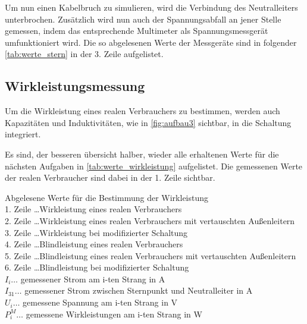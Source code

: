 \documentclass[12pt,english,ngerman]{scrartcl}
\begin{document}
Um nun einen Kabelbruch zu simulieren, wird die Verbindung des Neutralleiters
unterbrochen. Zusätzlich wird nun auch der Spannungsabfall an jener Stelle
gemessen, indem das entsprechende Multimeter als Spannungsmessgerät
umfunktioniert wird. Die so abgelesenen Werte der Messgeräte sind in folgender
\autoref{tab:werte_stern} in der 3. Zeile aufgelistet.

\subsection{Wirkleistungsmessung}
Um die Wirkleistung eines realen Verbrauchers zu bestimmen, werden auch
Kapazitäten und Induktivitäten, wie in \autoref{fig:aufbau3} sichtbar, in die
Schaltung integriert.

Es sind, der besseren übersicht halber, wieder alle erhaltenen Werte für die
nächsten Aufgaben in \autoref{tab:werte_wirkleistung} aufgelistet. Die
gemessenen Werte der realen Verbraucher sind dabei in der 1. Zeile sichtbar.

\begin{table}[H]
	\caption[Abgelesene Werte für die Bestimmung der Wirkleistung] {Abgelesene Werte für die
		Bestimmung der Wirkleistung                                                \\
		1. Zeile \dots Wirkleistung eines realen Verbrauchers                      \\
		2. Zeile \dots Wirkleistung eines realen Verbrauchers mit vertauschten
		Außenleitern                                                               \\
		3. Zeile \dots Wirkleistung bei modifizierter Schaltung                    \\
		4. Zeile \dots Blindleistung eines realen Verbrauchers                     \\
		5. Zeile \dots Blindleistung eines realen Verbrauchers mit vertauschten
		Außenleitern                                                               \\
		6. Zeile \dots Blindleistung bei modifizierter Schaltung                   \\
		$I_i \dots$ gemessener Strom am i-ten Strang in A                          \\
		$I_{31} \dots$ gemessener Strom zwischen Sternpunkt und Neutralleiter in A \\
		$U_{i} \dots$ gemessene Spannung am i-ten Strang in V                      \\
		$P_{i}^M \dots$ gemessene Wirkleistungen am i-ten Strang in W 
	}\label{tab:werte_wirkleistung}
	\centering
	
	
\end{table}
\end{document}

